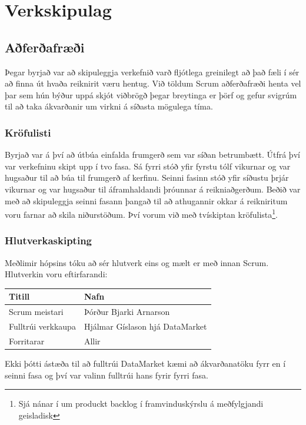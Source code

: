 \documentclass{article}
\begin{document}
\newpage

\section{Verkskipulag}


\subsection{Aðferðafræði}

Þegar byrjað var að skipuleggja verkefnið varð fljótlega greinilegt að það 
fæli í sér að finna út hvaða reiknirit væru hentug. Við töldum Scrum aðferðafræði 
henta vel þar sem hún býður uppá skjót viðbrögð þegar breytinga er þörf og 
gefur svigrúm til að taka ákvarðanir um virkni á síðasta mögulega tíma.
\subsubsection{Kröfulisti}
Byrjað var á því að útbúa einfalda frumgerð sem var síðan betrumbætt.
Útfrá því var verkefninu skipt upp í tvo fasa. 
Sá fyrri stóð yfir fyrstu tólf vikurnar og var hugsaður til að búa til frumgerð af kerfinu.
Seinni fasinn stóð yfir síðustu þrjár vikurnar og var hugsaður til áframhaldandi þróunnar á reikniaðgerðum.
Beðið var með að skipuleggja seinni fasann þangað til að athugannir okkar á reikniritum voru farnar að skila niðurstöðum. 
Því vorum við með tvískiptan kröfulista\footnote[1]{Sjá nánar í 
um produckt backlog í framvinduskýrslu á meðfylgjandi geisladisk}.

\subsubsection{Hlutverkaskipting}

Meðlimir hópsins tóku að sér hlutverk eins og mælt er með innan Scrum. Hlutverkin voru eftirfarandi:

\vspace{5 mm}
\begin{tabular}{| l | l |}
\hline
Titill & Nafn \\
\hline \hline
Scrum meistari & Þórður Bjarki Arnarson\\
\hline
Fulltrúi verkkaupa & Hjálmar Gíslason hjá DataMarket\\
\hline
Forritarar & Allir \\
\hline
\end{tabular}
\vspace{5 mm}

Ekki þótti ástæða til að fulltrúi 
DataMarket kæmi að ákvarðanatöku fyrr en í seinni fasa og því var 
valinn fulltrúi hans fyrir fyrri fasa.
\end{document}
